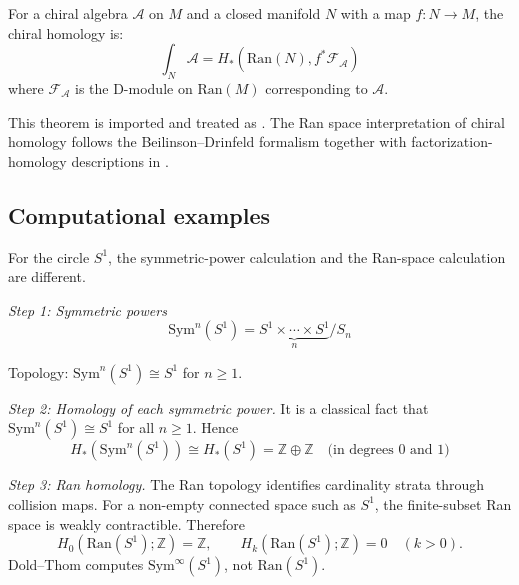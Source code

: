 \begin{theorem}
\label{thm:chiral-homology-ran}
For a chiral algebra $\mathcal{A}$ on $M$ and a closed manifold $N$ with a map
$f: N \to M$, the chiral homology is:
\[\int_N \mathcal{A} = H_*(\text{Ran}(N), f^* \mathcal{F}_{\mathcal{A}})\]
where $\mathcal{F}_{\mathcal{A}}$ is the D-module on $\text{Ran}(M)$ corresponding
to $\mathcal{A}$.
\end{theorem}

\begin{remark}
This theorem is imported and treated as \ClaimStatusProvedElsewhere. The Ran
space interpretation of chiral homology follows the Beilinson--Drinfeld
formalism \cite[Chapter~3]{BD04} together with factorization-homology
descriptions in \cite{CG17,AF15}.
\end{remark}

\subsection{Computational examples}

\begin{example}
\label{ex:homology-ran-S1}
For the circle $S^1$, the symmetric-power calculation and the Ran-space
calculation are different.

\emph{Step 1: Symmetric powers}
\[\text{Sym}^n(S^1) = \underbrace{S^1 \times \cdots \times S^1}_{n}/S_n\]

Topology: $\text{Sym}^n(S^1)\cong S^1$ for $n\geq1$.

\emph{Step 2: Homology of each symmetric power.}
It is a classical fact that $\text{Sym}^n(S^1)\cong S^1$ for all
$n\geq1$. Hence
\[H_*(\text{Sym}^n(S^1)) \cong H_*(S^1) = \mathbb{Z} \oplus \mathbb{Z} \quad
 \text{(in degrees 0 and 1)}\]

\emph{Step 3: Ran homology.}
The Ran topology identifies cardinality strata through collision maps.
For a non-empty connected space such as $S^1$, the finite-subset Ran
space is weakly contractible. Therefore
\[
H_0(\text{Ran}(S^1);\mathbb Z)=\mathbb Z,\qquad
H_k(\text{Ran}(S^1);\mathbb Z)=0\quad(k>0).
\]
Dold--Thom computes $\text{Sym}^\infty(S^1)$, not
$\text{Ran}(S^1)$.
\end{example}

